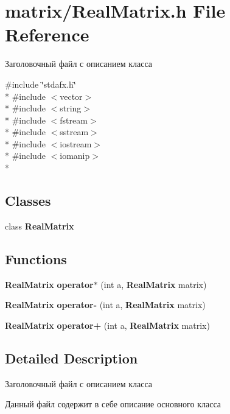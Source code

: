 \section{matrix/\+Real\+Matrix.h File Reference}
\label{_real_matrix_8h}


Заголовочный файл с описанием класса  


{\ttfamily \#include \char`\"{}stdafx.\+h\char`\"{}}\\*
{\ttfamily \#include $<$vector$>$}\\*
{\ttfamily \#include $<$string$>$}\\*
{\ttfamily \#include $<$fstream$>$}\\*
{\ttfamily \#include $<$sstream$>$}\\*
{\ttfamily \#include $<$iostream$>$}\\*
{\ttfamily \#include $<$iomanip$>$}\\*
\subsection*{Classes}
\begin{DoxyCompactItemize}
\item 
class {\bf Real\+Matrix}
\end{DoxyCompactItemize}
\subsection*{Functions}
\begin{DoxyCompactItemize}
\item 
{\bf Real\+Matrix} {\bf operator$\ast$} (int a, {\bf Real\+Matrix} matrix)
\item 
{\bf Real\+Matrix} {\bfseries operator-\/} (int a, {\bf Real\+Matrix} matrix)\label{_real_matrix_8h_a3337209055650acae14b38a6b86d8232}

\item 
{\bf Real\+Matrix} {\bfseries operator+} (int a, {\bf Real\+Matrix} matrix)\label{_real_matrix_8h_a18c69eb03685168207aabdee31de1c2b}

\end{DoxyCompactItemize}


\subsection{Detailed Description}
Заголовочный файл с описанием класса 

Данный файл содержит в себе описание основного класса 

